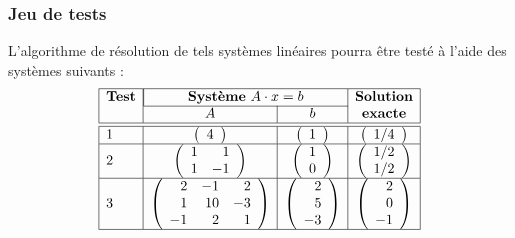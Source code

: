 \subsubsection*{Jeu de tests}
\label{casgeneral}
L'algorithme de résolution de tels systèmes linéaires pourra être testé
à l'aide des systèmes suivants :
$$\begin{array}{|l|c|c|c|}
\hline
\mbox{\bf Test} & \multicolumn{2}{|c|}{\mbox{{\bf Système} $A\cdot x = b$}} & \bf Solution\\
\cline{2-3}
                & A & b & \bf exacte \\
\hline
\hline
1 
& 
\left(\begin{array}{r}
4
\end{array}\right) 
&
\left(\begin{array}{r}
1
\end{array}\right) 
&
\displaystyle
\left(\begin{array}{r}
1/4
\end{array}\right)\\
\hline
2 
& 
\left(\begin{array}{rr}
1 & 1 \\
1 & -1
\end{array}\right) 
&
\left(\begin{array}{r}
1 \\ 0
\end{array}\right)
&
\displaystyle
\left(\begin{array}{r}
1/2 \\ 1/2
\end{array}\right)
\\
\hline
3 
& 
\left(\begin{array}{rrr}
2 & -1 & 2 \\
1 & 10 & -3 \\
-1 & 2 & 1
\end{array}\right) 
&
\left(\begin{array}{r}
2 \\ 5 \\ -3
\end{array}\right)
&
\left(\begin{array}{r}
2 \\ 0 \\ -1
\end{array}\right)
\\
\hline
\end{array}$$


